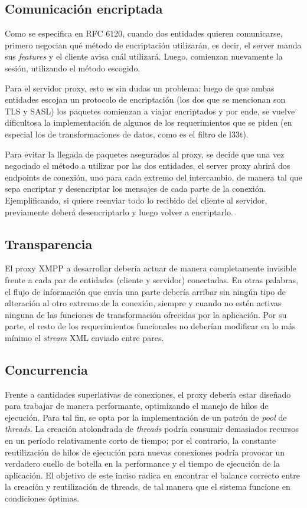 \documentclass[a4paper,10pt]{article}
\begin{document}
\subsection{Comunicación encriptada}
Como se especifica en RFC 6120, cuando dos entidades quieren comunicarse, primero negocian qué método de encriptación utilizarán, es decir, el server manda sus \textit{features}
y el cliente avisa cuál utilizará. Luego, comienzan nuevamente la sesión, utilizando el método escogido.
\par Para el servidor proxy, esto es sin dudas un problema: luego de que ambas entidades escojan un protocolo de encriptación (los dos que se mencionan
son TLS y SASL) los paquetes comienzan a viajar encriptados y por ende, se vuelve dificultosa la implementación de algunos de los requerimientos que se piden (en especial los de transformaciones de datos, como es el filtro de l33t).
\par Para evitar la llegada de paquetes asegurados al proxy, se decide que una vez negociado el método a utilizar por las dos entidades, el server proxy abrirá dos endpoints de conexión, uno para cada extremo del intercambio, de manera tal que sepa encriptar y desencriptar los mensajes de cada
parte de la conexión. Ejemplificando, si quiere reenviar todo lo recibido del cliente al servidor, previamente deberá desencriptarlo y luego volver a encriptarlo.

\subsection{Transparencia}
El proxy XMPP a desarrollar debería actuar de manera completamente invisible frente a cada par de entidades (cliente y servidor) conectadas.
En otras palabras, el flujo de información que envía una parte debería arribar sin ningún tipo de alteración al otro extremo
de la conexión, siempre y cuando no estén activas ninguna de las funciones de transformación ofrecidas por la aplicación. Por su parte, el resto
de los requerimientos funcionales no deberían modificar en lo más mínimo el \textit{stream} XML enviado entre pares.

\subsection{Concurrencia}
Frente a cantidades superlativas de conexiones, el proxy debería estar diseñado para trabajar de manera performante, optimizando el manejo de hilos de ejecución.
Para tal fin, se opta por la implementación de un patrón de \textit{pool} de \textit{threads}. La creación atolondrada de \textit{threads} podría consumir demasiados recursos
en un período relativamente corto de tiempo; por el contrario, la constante reutilización de hilos de ejecución para nuevas conexiones podría provocar un verdadero
cuello de botella en la performance y el tiempo de ejecución de la aplicación. El objetivo de este inciso radica en encontrar el balance correcto entre la creación y reutilización de threads,
de tal manera que el sistema funcione en condiciones óptimas.
\end{document}
